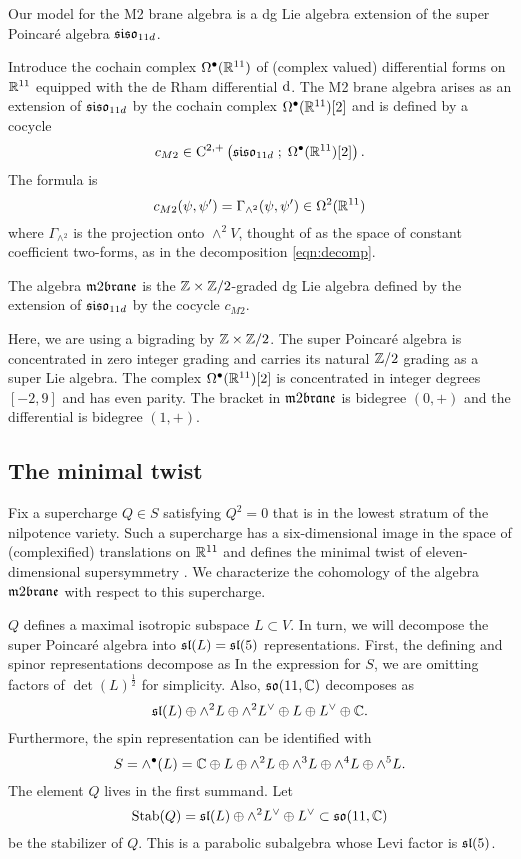 Our model for the M2 brane algebra is a dg Lie algebra extension of the super Poincar\'e algebra $\mathfrak{siso}_{11d}$.
 
Introduce the cochain complex $\Omega^{\bullet}(\mathbb R^{11})$ of (complex valued) differential forms on $\mathbb R^{11}$ equipped with the de Rham differential ${\rm d}$.
The M2 brane algebra arises as an extension of $\mathfrak{siso}_{11d}$ by the cochain complex $\Omega^\bullet(\mathbb R^{11})[2]$ and is defined by a cocycle
\[
    c_{M2} \in {\rm C}^{2,+} \left(\mathfrak{siso}_{11d} \; ; \; \Omega^\bullet (\mathbb R^{11})[2]\right) .
\]
The formula is
  \[c_{M2} (\psi, \psi') = \Gamma_{\wedge^2}(\psi, \psi') \in \Omega^2(\mathbb R^{11})\]
  where $\Gamma_{\wedge^2}$ is the projection onto $\wedge^2 V$, thought of as the space of constant coefficient two-forms, as in the decomposition \eqref{eqn:decomp}.

\begin{dfn}
The algebra $\m2$ is the $\mathbb Z \times \mathbb Z/2$-graded dg Lie algebra defined by the extension of $\mathfrak{siso}_{11d}$ by the cocycle $c_{M2}$.  
\end{dfn}
  
Here, we are using a bigrading by $\mathbb Z \times \mathbb Z/2$. 
The super Poincar\'e algebra is concentrated in zero integer grading and carries its natural $\mathbb Z/2$ grading as a super Lie algebra.
The complex $\Omega^{\bullet}(\mathbb R^{11})[2]$ is concentrated in integer degrees $[-2,9]$ and has even parity.
The bracket in $\m2$ is bidegree $(0,+)$ and the differential is bidegree $(1,+)$.




\subsection{The minimal twist}
\label{sec:mintwist}

Fix a supercharge $Q \in S$ satisfying $Q^2 = 0$ that is in the lowest stratum of the nilpotence variety.
Such a supercharge has a six-dimensional image in the space of (complexified) translations on $\mathbb R^{11}$ and defines the minimal twist of eleven-dimensional supersymmetry \cite{SWspinor}. 
We characterize the cohomology of the algebra $\m2$ with respect to this supercharge. 

$Q$ defines a maximal isotropic subspace $L \subset V$. 
In turn, we will decompose the super Poincar\'e algebra into $\mathfrak{sl}(L) = \mathfrak{sl}(5)$ representations.
First, the defining and spinor representations decompose as
In the expression for $S$, we are omitting factors of $\det(L)^{\frac12}$ for simplicity. 
Also, $\mathfrak{so}(11, \mathbb C)$ decomposes as
\[
\mathfrak{sl}(L) \oplus \wedge^2 L \oplus \wedge^2 L^\vee \oplus L \oplus L^\vee \oplus \mathbb{C} .
\]
Furthermore, the spin representation can be identified with
\[
S = \wedge^\bullet (L) = \mathbb C \oplus L \oplus \wedge^2 L \oplus \wedge^3 L \oplus \wedge^4 L \oplus \wedge^5 L .
\]
The element $Q$ lives in the first summand.
Let 
\[
{\rm Stab}(Q) =  \mathfrak{sl}(L) \oplus \wedge^2 L^\vee \oplus L^\vee \subset \mathfrak{so}(11,\mathbb C)
\]
 be the stabilizer of $Q$. 
This is a parabolic subalgebra whose Levi factor is $\mathfrak{sl}(5)$.

